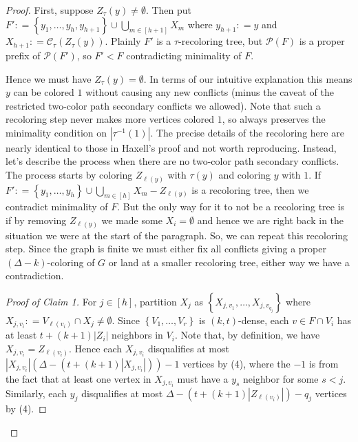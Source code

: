 \documentclass[12pt]{article}
\theoremstyle{plain}
\theoremstyle{definition}
\theoremstyle{remark}
\newcommand{\fancy}[1]{\mathcal{#1}}
\newcommand{\set}[1]{\left\{ #1 \right\}}
\newcommand{\card}[1]{\left|#1\right|}
\newcommand{\irange}[1]{\left[#1\right]}
\newcommand{\parens}[1]{\left( #1 \right)}
\newcommand{\DefinedAs}{\mathrel{\mathop:}=}
\begin{document}
\begin{proof}
First, suppose $Z_{\tau}(y) \ne \emptyset$.  Then put $F' \DefinedAs \set{y_1, \ldots, y_h, y_{h+1}} \cup \bigcup_{m \in \irange{h+1}} X_m$ where $y_{h+1} \DefinedAs y$ and $X_{h+1} \DefinedAs \fancy{C}_\tau\parens{Z_{\tau}(y)}$.  Plainly $F'$ is a $\tau$-recoloring tree, but $\fancy{P}(F)$ is a proper prefix of $\fancy{P}(F')$, so $F' < F$ contradicting minimality of $F$.

Hence we must have $Z_{\tau}(y) = \emptyset$.  In terms of our intuitive explanation this means $y$ can be colored $1$ without causing any new conflicts (minus the caveat of the restricted two-color path secondary conflicts we allowed).  Note that such a recoloring step never makes more vertices colored $1$, so always preserves the minimality condition on $\card{\tau^{-1}(1)}$. The precise details of the recoloring here are nearly identical to those in Haxell's proof and not worth reproducing.  Instead, let's describe the process when there are no two-color path secondary conflicts. The process starts by coloring $Z_{\ell(y)}$ with $\tau(y)$ and coloring $y$ with $1$.  If $F' \DefinedAs \set{y_1, \ldots, y_h} \cup \bigcup_{m \in \irange{h}} X_m - Z_{\ell(y)}$ is a recoloring tree, then we contradict minimality of $F$.  But the only way for it to not be a recoloring tree is if by removing $Z_{\ell(y)}$ we made some $X_i = \emptyset$ and hence we are right back in the situation we were at the start of the paragraph.  So, we can repeat this recoloring step.  Since the graph is finite we must either fix all conflicts giving a proper $(\Delta-k)$-coloring of $G$ or land at a smaller recoloring tree, either way we have a contradiction.

\begin{proof}[Proof of Claim 1]
For $j \in \irange{h}$, partition $X_j$ as $\set{X_{j, v_1}, \ldots, X_{j, v_{q_j}}}$ where $X_{j, v_i} \DefinedAs V_{\ell(v_i)} \cap X_j \ne \emptyset$.  Since $\set{V_1, \ldots, V_r}$ is $(k,t)$-dense, each $v \in F \cap V_i$ has at least $t + (k + 1)\card{Z_i}$ neighbors in $V_i$.  Note that, by definition, we have $X_{j, v_i} = Z_{\ell(v_i)}$.  Hence each $X_{j, v_i}$ disqualifies at most $\card{X_{j, v_i}}\parens{\Delta - \parens{t + (k + 1)\card{X_{j, v_i}}}} - 1$ vertices by (4), where the $-1$ is from the fact that at least one vertex in $X_{j, v_i}$ must have a $y_s$ neighbor for some $s < j$.  Similarly, each $y_j$ disqualifies at most $\Delta - \parens{t + (k + 1)\card{Z_{\ell(v_i)}}} - q_j$ vertices by (4).


\end{proof}
\end{proof}
\end{document}
